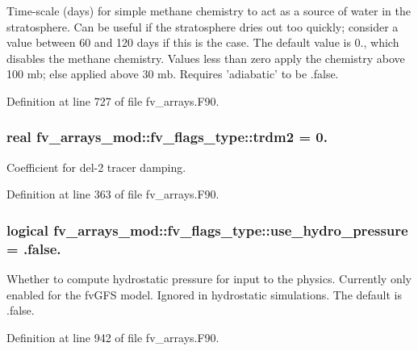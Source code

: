 Time-\/scale (days) for simple methane chemistry to act as a source of water in the stratosphere. Can be useful if the stratosphere dries out too quickly; consider a value between 60 and 120 days if this is the case. The default value is 0., which disables the methane chemistry. Values less than zero apply the chemistry above 100 mb; else applied above 30 mb. Requires 'adiabatic' to be .false. 



Definition at line 727 of file fv\-\_\-arrays.\-F90.

\subsubsection[{trdm2}]{\setlength{\rightskip}{0pt plus 5cm}real fv\-\_\-arrays\-\_\-mod\-::fv\-\_\-flags\-\_\-type\-::trdm2 = 0.}\label{structfv__arrays__mod_1_1fv__flags__type_a4a2e560c5d7f89ce6f1c6bdc14b26c43}


Coefficient for del-\/2 tracer damping. 



Definition at line 363 of file fv\-\_\-arrays.\-F90.

\subsubsection[{use\-\_\-hydro\-\_\-pressure}]{\setlength{\rightskip}{0pt plus 5cm}logical fv\-\_\-arrays\-\_\-mod\-::fv\-\_\-flags\-\_\-type\-::use\-\_\-hydro\-\_\-pressure = .false.}\label{structfv__arrays__mod_1_1fv__flags__type_acb17c1ce352a3f01c6f98f7ec37c15cc}


Whether to compute hydrostatic pressure for input to the physics. Currently only enabled for the fv\-G\-F\-S model. Ignored in hydrostatic simulations. The default is .false. 



Definition at line 942 of file fv\-\_\-arrays.\-F90.

